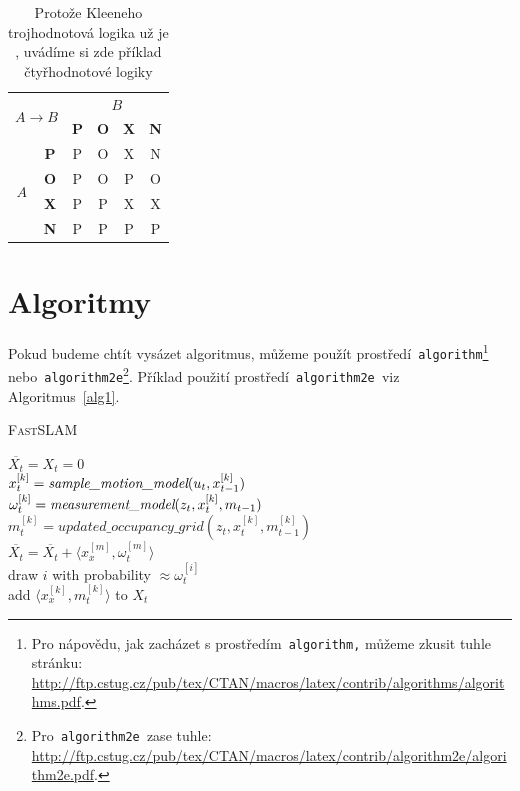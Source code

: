 \documentclass[a4paper, 11pt, hidelinks]{article}
\begin{document}
\begin{table}[h]
\begin{tabular}{|c|c|c|c|c|c|}
\hline
\multicolumn{2}{|c|}{\multirow{2}{*}{$A \rightarrow B$}} & \multicolumn{4}{c|}{$B$}                     \\ \cline{3-6} 
\multicolumn{2}{|c|}{}                     & \textbf{P} & \textbf{O} & \textbf{X} & \textbf{N} \\ \hline
\multirow{4}{*}{$A$}       & \textbf{P}      & P          & O          & X          & N          \\ \cline{2-6} 
                         & \textbf{O}      & P          & O          & P          & O          \\ \cline{2-6} 
                         & \textbf{X}      & P          & P          & X          & X          \\ \cline{2-6} 
                         & \textbf{N}      & P          & P          & P          & P          \\ \hline
\end{tabular}
\caption{Protože Kleeneho trojhodnotová logika už je , uvádíme si zde příklad čtyřhodnotové logiky}
\label{tabulka2}
\end{table}
\pagebreak

\section{Algoritmy}
\label{algoritmy}
Pokud budeme chtít vysázet algoritmus, můžeme použít prostředí\texttt{ algorithm}\footnote{Pro nápovědu, jak zacházet s prostředím\texttt{ algorithm,} můžeme zkusit tuhle stránku: \\
\url{http://ftp.cstug.cz/pub/tex/CTAN/macros/latex/contrib/algorithms/algorithms.pdf}.} nebo\texttt{ algorithm2e}\footnote{Pro\texttt{ algorithm2e }zase tuhle:
\url{http://ftp.cstug.cz/pub/tex/CTAN/macros/latex/contrib/algorithm2e/algorithm2e.pdf}.}. Příklad použití prostředí\texttt{ algorithm2e }viz Algoritmus~\ref{alg1}.

\IncMargin{1.5em}
\begin{algorithm}

\caption{\textsc{FastSLAM}}
\label{alg1}
\SetNlSty{}{}{:}

\Indm\Indmm
{}
\Indp\Indpp

\medskip
$ \overline{X_t} = X_t = 0 $ \\
{
$x_{t}^{[k]}= \emph{sample\_motion\_model} (u_{t}, x_{t-1}^{[k]})$ \\
$\omega_{t}^{[k]}= \emph{measurement\_model} (z_{t}, x_{t}^{[k]}, m_{t-1})$ \\
$m_{t}^{[k]}= updated\_occupancy\_grid (z_{t}, x_{t}^{[k]}, m_{t-1}^{[k]})$ \\
$\overline{X_{t}}=\overline{X_{t}}+\langle x_{x}^{[m]}, \omega_{t}^{[m]}\rangle$ \\
}
{
    draw $i$ with probability $\approx \omega_{t}^{[i]}$ \\
    add $ \langle x_{x}^{[k]}, m_{t}^{[k]}\rangle$ to  $X_{t}$
}

\end{algorithm}
\DecMargin{1.5em}
\end{document}
